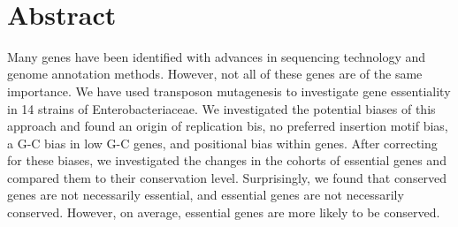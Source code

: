 \documentclass[12pt,letterpaper]{article}
\begin{document}
\vspace*{0.35in}

\begin{flushleft}
{\Large
\textbf{}
}
\newline
\\

\end{flushleft}

\section*{Abstract}
Many genes have been identified with advances in sequencing technology and genome annotation methods. However, not all of these genes are of the same importance. We have used transposon mutagenesis to investigate gene essentiality in 14 strains of Enterobacteriaceae. We investigated the potential biases of this approach and found an origin of replication bis, no preferred insertion motif bias, a G-C bias in low G-C genes,  and positional bias within genes. After correcting for these biases, we investigated the changes in the cohorts of essential genes and compared them to their conservation level. Surprisingly, we found that conserved genes are not necessarily essential, and essential genes are not necessarily conserved. However, on average, essential genes are more likely to be conserved.


\end{document}
